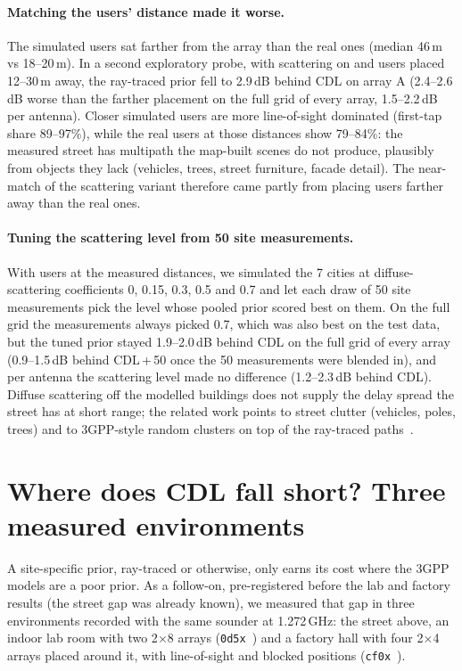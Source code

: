 \documentclass[11pt]{article}
\begin{document}
\paragraph{Matching the users' distance made it worse.} The simulated users
sat farther from the array than the real ones (median 46\,m vs 18--20\,m). In a
second exploratory probe, with scattering on and users placed 12--30\,m away,
the ray-traced prior fell to 2.9\,dB behind CDL on array A (2.4--2.6\,dB worse
than the farther placement on the full grid of every array, 1.5--2.2\,dB per
antenna). Closer simulated users
are more line-of-sight dominated (first-tap share 89--97\%), while the real
users at those distances show 79--84\%: the measured street has multipath
the map-built scenes do not produce, plausibly from objects they lack
(vehicles, trees, street furniture, facade detail). The near-match of the
scattering variant therefore came partly from placing users farther away than
the real ones.

\paragraph{Tuning the scattering level from 50 site measurements.} With users at
the measured distances, we simulated the 7 cities at diffuse-scattering
coefficients 0, 0.15, 0.3, 0.5 and 0.7 and let each draw of 50 site
measurements pick the level whose pooled prior scored best on them. On the
full grid the measurements always picked 0.7, which was also best on the test
data, but the
tuned prior stayed 1.9--2.0\,dB behind CDL on the full grid of every array
(0.9--1.5\,dB behind CDL\,+\,50 once the 50 measurements were blended in), and
per antenna the scattering level made no difference (1.2--2.3\,dB behind
CDL). Diffuse scattering off the modelled buildings does not supply the delay
spread the street has at short range; the related work points to street
clutter (vehicles, poles, trees) and to 3GPP-style random clusters on top of
the ray-traced paths~\cite{tr38901}.

\section{Where does CDL fall short? Three measured environments}
\label{sec:cdlgap}

A site-specific prior, ray-traced or otherwise, only earns its cost where the
3GPP models are a poor prior. As a follow-on, pre-registered before the
lab and factory results (the street gap was already known), we measured that gap in three environments recorded with the same
sounder at 1.272\,GHz: the street above, an indoor lab room with two 2$\times$8
arrays (\texttt{0d5x}~\cite{dichasuslab}) and a factory hall with four
2$\times$4 arrays placed around it, with line-of-sight and blocked positions
(\texttt{cf0x}~\cite{dichasusfactory}).
\end{document}
